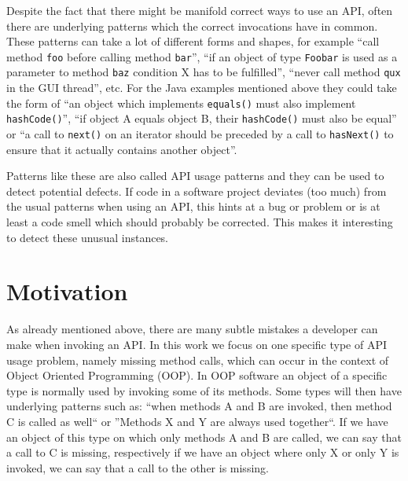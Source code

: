 Despite the fact that there might be manifold correct ways to use an API, often there are underlying patterns which the correct invocations have in common.
These patterns can take a lot of different forms and shapes, for example ``call method \texttt{foo} before calling method \texttt{bar}'', ``if an object of type \texttt{Foobar} is used as a parameter to method \texttt{baz} condition X has to be fulfilled'', ``never call method \texttt{qux} in the GUI thread'', etc.
For the Java examples mentioned above they could take the form of ``an object which implements \texttt{equals()} must also implement \texttt{hashCode()}'', ``if object A equals object B, their \texttt{hashCode()} must also be equal'' or ``a call to \texttt{next()} on an iterator should be preceded by a call to \texttt{hasNext()} to ensure that it actually contains another object''.

Patterns like these are also called API usage patterns \cite{robillard2013automated} and they can be used to detect potential defects.
If code in a software project deviates (too much) from the usual patterns when using an API, this hints at a bug or problem or is at least a code smell which should probably be corrected.
This makes it interesting to detect these unusual instances.

\section{Motivation}

As already mentioned above, there are many subtle mistakes a developer can make when invoking an API.
In this work we focus on one specific type of API usage problem, namely missing method calls, which can occur in the context of Object Oriented Programming (OOP).
In OOP software an object of a specific type is normally used by invoking some of its methods.
Some types will then have underlying patterns such as: ``when methods A and B are invoked, then method C is called as well`` or ''Methods X and Y are always used together``.
If we have an object of this type on which only methods A and B are called, we can say that a call to C is missing, respectively if we have an object where only X or only Y is invoked, we can say that a call to the other is missing.

